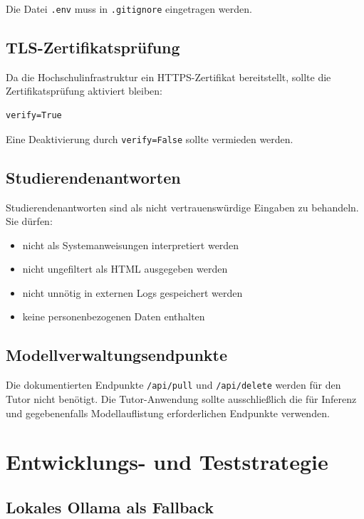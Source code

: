 \documentclass[11pt,a4paper,oneside,ngerman]{memoir}
\begin{document}
Die Datei \texttt{.env} muss in \texttt{.gitignore} eingetragen werden.

\section{TLS-Zertifikatsprüfung}

Da die Hochschulinfrastruktur ein HTTPS-Zertifikat bereitstellt, sollte die Zertifikatsprüfung aktiviert bleiben:

\begin{verbatim}
verify=True
\end{verbatim}

Eine Deaktivierung durch \texttt{verify=False} sollte vermieden werden.

\section{Studierendenantworten}

Studierendenantworten sind als nicht vertrauenswürdige Eingaben zu behandeln. Sie dürfen:

\begin{itemize}
    \item nicht als Systemanweisungen interpretiert werden
    \item nicht ungefiltert als HTML ausgegeben werden
    \item nicht unnötig in externen Logs gespeichert werden
    \item keine personenbezogenen Daten enthalten
\end{itemize}

\section{Modellverwaltungsendpunkte}

Die dokumentierten Endpunkte \texttt{/api/pull} und \texttt{/api/delete} werden für den Tutor nicht benötigt. Die Tutor-Anwendung sollte ausschließlich die für Inferenz und gegebenenfalls Modellauflistung erforderlichen Endpunkte verwenden.

\chapter{Entwicklungs- und Teststrategie}

\section{Lokales Ollama als Fallback}
\end{document}
